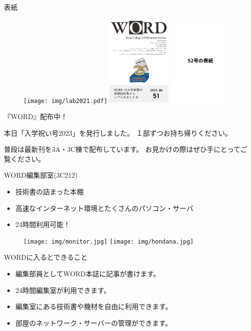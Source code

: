 \documentclass[lualatex]{beamer}
\begin{document}
\begin{frame}[plain]{表紙}
 \begin{figure}
  \centering
  \texttt{[image: img/lab2021.pdf]}
  \includegraphics[width=32mm]{img/word51.pdf}
  \includegraphics[width=32mm]{img/word52.pdf}
 \end{figure}
\end{frame}

\begin{frame}[plain]{『WORD』配布中！}

	本日「入学祝い号2023」を発行しました。
  １部ずつお持ち帰りください。

	普段は最新刊を3A・3C棟で配布しています。 お見かけの際はぜひ手にとってご覧ください。
\end{frame}

\begin{frame}[plain]{WORD編集部室(3C212)}
 \begin{itemize}
  \item 技術書の詰まった本棚
  \item 高速なインターネット環境とたくさんのパソコン・サーバ
  \item 24時間利用可能！
 \end{itemize}
  \begin{figure}
   \centering
   \texttt{[image: img/monitor.jpg]}
   \texttt{[image: img/hondana.jpg]}
  \end{figure}
\end{frame}

\begin{frame}[plain]{WORDに入るとできること}
  \begin{itemize}
   \item 編集部員としてWORD本誌に記事が書けます。
   \item 24時間編集室が利用できます。
   \item 編集室にある技術書や機材を自由に利用できます。
   \item 部屋のネットワーク・サーバーの管理ができます。
  \end{itemize}
\end{frame}
\end{document}
